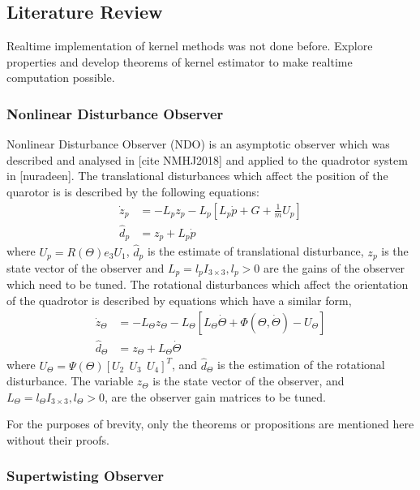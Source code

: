 \documentclass{article}
\begin{document}
\subsection{Literature Review}
Realtime implementation of kernel methods was not done before. Explore properties and develop theorems of kernel estimator to make realtime computation possible.

\subsubsection{Nonlinear Disturbance Observer}
Nonlinear Disturbance Observer (NDO) is an asymptotic observer which was described and analysed in [cite NMHJ2018] and applied to the quadrotor system in [nuradeen]. The translational disturbances which affect the position of the quarotor is is described by the following equations: 
\begin{equation}
\begin{split}
\label{eq5:a}
\dot{z}_p &= -L_pz_p - L_p[L_p\dot{p}+G+\frac{1}{m}U_p ]\\
\hat{d}_p&=z_p + L_p\dot{p}
\end{split}
\end{equation}
where $U_p=R(\Theta) e_3 U_1$, $\widehat{d}_p$ is the estimate of translational disturbance,  $z_p$ is the state vector of the observer and $L_p=l_p I_{3 \times 3}, l_p >0$ are the gains of the observer which need to be tuned. 
The rotational disturbances which affect the orientation of the quadrotor is described by equations which have a similar form, 
\begin{equation}
\begin{split}
\label{eq5:b}
\dot{z}_\Theta &= -L_\Theta z_\Theta - L_\Theta[L_\Theta\dot{\Theta}+\Phi(\Theta,\dot{\Theta}) - U_\Theta] \\
\hat{d}_\Theta&=z_\Theta + L_\Theta\dot{\Theta}
\end{split}
\end{equation}
where $U_\Theta=\Psi(\Theta)[U_2\ \ U_3\ \ U_4]^T$, and $\widehat{d}_\Theta$ is the estimation of the rotational disturbance. The variable $z_\Theta$ is the state vector of the observer, and $L_\Theta=l_\Theta I_{3 \times 3}, l_\Theta >0$, are the observer gain matrices to be tuned.

For the purposes of brevity, only the theorems or propositions are mentioned here without their proofs. 

\subsubsection{Supertwisting Observer}
\end{document}
